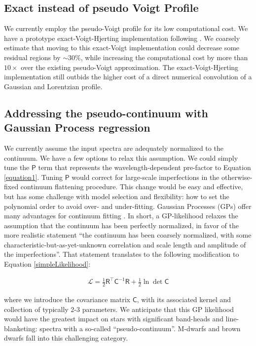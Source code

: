 \documentclass[trackchanges]{aastex631}
\begin{document}
\subsection{Exact instead of pseudo Voigt Profile}
We currently employ the pseudo-Voigt profile for its low computational cost.  We have a prototype exact-Voigt-Hjerting implementation following \citet{2022ApJS..258...31K}.  We coarsely estimate that moving to this exact-Voigt implementation could decrease some residual regions by $\sim 30\%$, while increasing the computational cost by more than $10\times$ over the existing pseudo-Voigt approximation.  The exact-Voigt-Hjerting implementation still outbids the higher cost of a direct numerical convolution of a Gaussian and Lorentzian profile.



\subsection{Addressing the pseudo-continuum with Gaussian Process regression}

We currently assume the input spectra are adequately normalized to the continuum.  We have a few options to relax this assumption.  We could  simply tune the $\mathsf{P}$ term that represents the wavelength-dependent pre-factor to Equation \ref{equation1}.  Tuning $\mathsf{P}$ would correct for large-scale imperfections in the otherwise-fixed continuum flattening procedure.  This change would be easy and effective, but has some challenge with model selection and flexibility: how to set the polynomial order to avoid over- and under-fitting.  Gaussian Processes (GPs) offer many advantages for continuum fitting \citep{czekala15}.  In short, a GP-likelihood relaxes the assumption that the continuum has been perfectly normalized, in favor of the more realistic statement ``the continuum has been coarsely normalized, with some characteristic-but-as-yet-unknown correlation and scale length and amplitude of the imperfections''.  That statement translates to the following modification to Equation \ref{simpleLikelihood}:

\begin{eqnarray}
    \mathcal{L} =  \frac{1}{2}\mathsf{R^\intercal} \mathsf{C}^{-1} \mathsf{R} +\frac{1}{2}\ln{\det{\mathsf{C}}} \label{GPLikelihood}
\end{eqnarray}

\noindent where we introduce the covariance matrix $\mathsf{C}$, with its associated kernel and collection of typically 2-3 parameters.  We anticipate that this GP likelihood would have the greatest impact on stars with significant band-heads and line-blanketing: spectra with a so-called ``pseudo-continuum''.  M-dwarfs and brown dwarfs fall into this challenging category.
\end{document}
